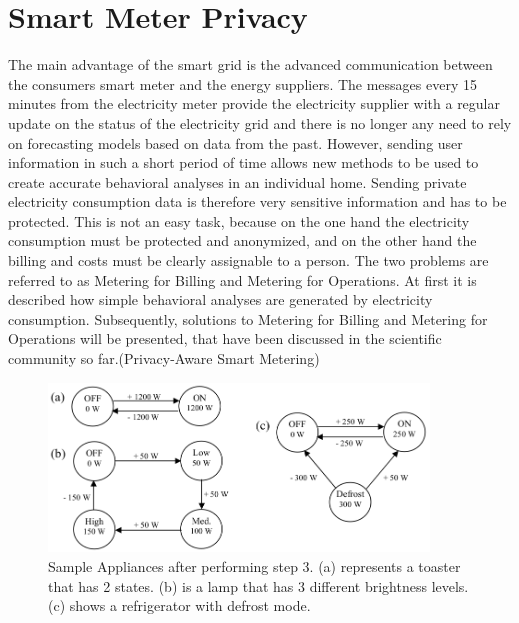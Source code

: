 \section{Smart Meter Privacy}
The main advantage of the smart grid is the advanced communication between the consumers smart meter and the energy suppliers. The messages every 15 minutes from the electricity meter provide the electricity supplier with a regular update on the status of the electricity grid and there is no longer any need to rely on forecasting models based on data from the past. However, sending user information in such a short period of time allows new methods to be used to create accurate behavioral analyses in an individual home. Sending private electricity consumption data is therefore very sensitive information and has to be protected. This is not an easy task, because on the one hand the electricity consumption must be protected and anonymized, and on the other hand the billing and costs must be clearly assignable to a person. The two problems are referred to as Metering for Billing and Metering for Operations. At first it is described how simple behavioral analyses are generated by electricity consumption. Subsequently, solutions to Metering for Billing and Metering for Operations will be presented, that have been discussed in the scientific community so far.(Privacy-Aware Smart Metering) \begin{figure}[htbp!]
  \centering
  \includegraphics[width=0.9\textwidth]{images/Appliance_Model.png}
  \caption[Appliance Model]{Sample Appliances after performing step 3. (a) represents a toaster that has 2 states. (b) is a lamp that has 3 different brightness levels. (c) shows a refrigerator with defrost mode.}
  \label{fig:Appliance_Model}
\end{figure}

